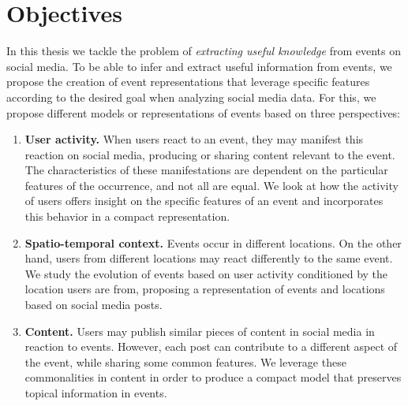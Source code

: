 

\section{Objectives}

In this thesis we tackle the problem of {\em extracting useful
knowledge} from events on social media. 
%
To be able to infer and extract useful information from events, we propose the
creation of event representations that leverage specific features according
to the desired goal when analyzing social media data.
%
For this, we propose different models or representations of events based on
three perspectives:
%

\begin{enumerate}
    \item {\bf User activity.} 
    When users react to an event, they may manifest this reaction on social
    media, producing or sharing content relevant to the event. 
    The characteristics of these manifestations are dependent on the particular
    features of the occurrence, and not all are equal. 
    We look at how the activity of users offers insight on the specific
    features of an event and incorporates this behavior in a compact
    representation.

    \item {\bf Spatio-temporal context.} 
    Events occur in different locations. 
    On the other hand, users from different locations may react differently to
    the same event.
    We study the evolution of events based on user activity conditioned by the
    location users are from, proposing a representation of events and locations
    based on social media posts.

    \item {\bf Content.} 
    Users may publish similar pieces of content in social media in reaction to
    events.
    However, each post can contribute to a different aspect of the event, while
    sharing some common features.
    We leverage these commonalities in content in order to produce a compact model that
    preserves topical information in events.
    
\end{enumerate}



